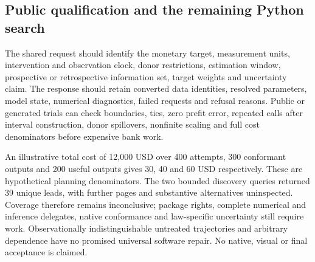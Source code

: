 \subsection{Public qualification and the remaining Python search}
The shared request should identify the monetary target, measurement units,
intervention and observation clock, donor restrictions, estimation window,
prospective or retrospective information set, target weights and uncertainty
claim. The response should retain converted data identities, resolved
parameters, model state, numerical diagnostics, failed requests and refusal
reasons. Public or generated trials can check boundaries, ties, zero
prefit error, repeated calls after interval construction, donor spillovers,
nonfinite scaling and full cost denominators before expensive bank work.
\citep{exec25_synthpy_choice}

An illustrative total cost of 12,000 USD over 400 attempts, 300 conformant
outputs and 200 useful outputs gives 30, 40 and 60 USD respectively.
These are hypothetical planning denominators. The two bounded discovery
queries returned 39 unique leads, with further pages and substantive
alternatives uninspected. Coverage therefore remains inconclusive; package
rights, complete numerical and inference delegates, native conformance and
law-specific uncertainty still require work. Observationally indistinguishable
untreated trajectories and arbitrary dependence have no promised universal
software repair. No native, visual or final acceptance is claimed.
\citep{exec25_synthpy_choice}
